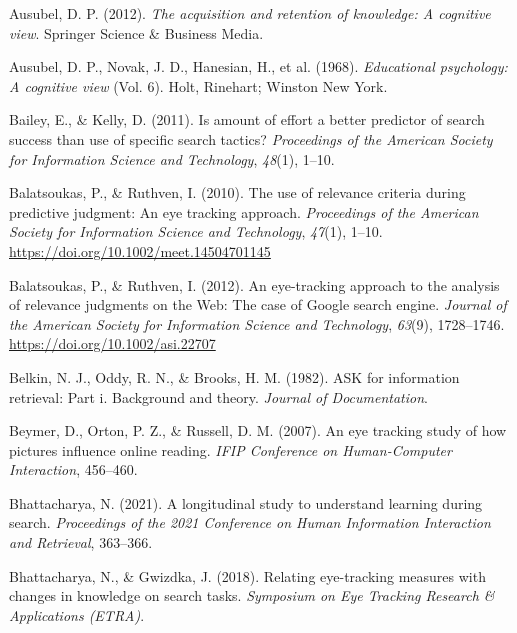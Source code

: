 \documentclass[letterpaper, nobind]{templates/ociamthesis}
\newlength{\cslhangindent}
\newenvironment{CSLReferences}[2] %
 {%
  \setlength{\parindent}{0pt}
  \ifodd #1
  \let\oldpar\par
  \def\par{\hangindent=\cslhangindent\oldpar}
  \fi
  \setlength{\parskip}{1mm}
  \setlength{\baselineskip}{6mm}
 }%
 {}
\begin{document}
\begin{CSLReferences}{1}{0}
\leavevmode{}%
Ausubel, D. P. (2012). \emph{The acquisition and retention of knowledge: A cognitive view}. Springer Science \& Business Media.

\leavevmode{}%
Ausubel, D. P., Novak, J. D., Hanesian, H., et al. (1968). \emph{Educational psychology: A cognitive view} (Vol. 6). Holt, Rinehart; Winston New York.

\leavevmode{}%
Bailey, E., \& Kelly, D. (2011). Is amount of effort a better predictor of search success than use of specific search tactics? \emph{Proceedings of the American Society for Information Science and Technology}, \emph{48}(1), 1--10.

\leavevmode{}%
Balatsoukas, P., \& Ruthven, I. (2010). The use of relevance criteria during predictive judgment: {An} eye tracking approach. \emph{Proceedings of the American Society for Information Science and Technology}, \emph{47}(1), 1--10. \url{https://doi.org/10.1002/meet.14504701145}

\leavevmode{}%
Balatsoukas, P., \& Ruthven, I. (2012). An eye-tracking approach to the analysis of relevance judgments on the {Web}: {The} case of {Google} search engine. \emph{Journal of the American Society for Information Science and Technology}, \emph{63}(9), 1728--1746. \url{https://doi.org/10.1002/asi.22707}

\leavevmode{}%
Belkin, N. J., Oddy, R. N., \& Brooks, H. M. (1982). ASK for information retrieval: Part i. Background and theory. \emph{Journal of Documentation}.

\leavevmode{}%
Beymer, D., Orton, P. Z., \& Russell, D. M. (2007). An eye tracking study of how pictures influence online reading. \emph{IFIP Conference on Human-Computer Interaction}, 456--460.

\leavevmode{}%
Bhattacharya, N. (2021). A longitudinal study to understand learning during search. \emph{Proceedings of the 2021 Conference on Human Information Interaction and Retrieval}, 363--366.

\leavevmode{}%
Bhattacharya, N., \& Gwizdka, J. (2018). Relating eye-tracking measures with changes in knowledge on search tasks. \emph{Symposium on Eye Tracking Research \& Applications (ETRA)}.


\end{CSLReferences}
\end{document}
